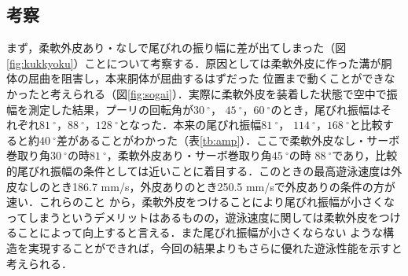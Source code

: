 \newpage
\subsection{考察}
まず，柔軟外皮あり・なしで尾びれの振り幅に差が出てしまった（図\ref{fig:kukkyoku}）ことについて考察する．原因としては柔軟外皮に作った溝が胴体の屈曲を阻害し，本来胴体が屈曲するはずだった
位置まで動くことができなかったと考えられる（図\ref{fig:sogai}）．実際に柔軟外皮を装着した状態で空中で振幅を測定した結果，プーリの回転角が$30\:^\circ$，
$45\:^\circ$，$60\:^\circ$のとき，尾びれ振幅はそれぞれ$81\:^\circ$，$88\:^\circ$，$128\:^\circ$となった．本来の尾びれ振幅$81\:^\circ$，
$114\:^\circ$，$168\:^\circ$と比較すると約$40\:^\circ$差があることがわかった（表\ref{tb:amp}）．ここで柔軟外皮なし・サーボ巻取り角$30\:^\circ$の時$81\:^\circ$，柔軟外皮あり・サーボ巻取り角$45\:^\circ$の時
$88\:^\circ$であり，比較的尾びれ振幅の条件としては近いことに着目する．このときの最高遊泳速度は外皮なしのとき186.7 mm/s，外皮ありのとき250.5 mm/sで外皮ありの条件の方が速い．これらのこと
から，柔軟外皮をつけることにより尾びれ振幅が小さくなってしまうというデメリットはあるものの，遊泳速度に関しては柔軟外皮をつけることによって向上すると言える．また尾びれ振幅が小さくならない
ような構造を実現することができれば，今回の結果よりもさらに優れた遊泳性能を示すと考えられる．

